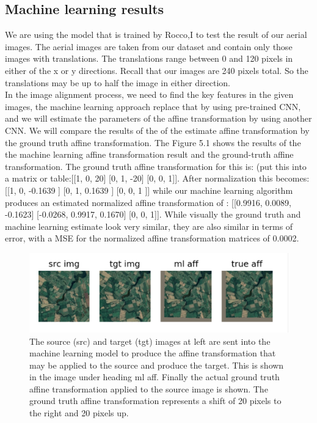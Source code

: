 \subsection{Machine learning results}
We are using the model that is trained by Rocco,I\cite{Rocco18} to test the result of our aerial images. 
The aerial images are taken from our dataset and contain only those images with translations. The translations range between 0 and 120 pixels in either of the x or y directions. Recall that our images are 240 pixels total. So the translations may be up to half the image in either direction.\\
  In the image alignment process, we need to find the key features in the given images, the machine learning approach replace that by using pre-trained CNN, and we will estimate the parameters of the affine transformation by using another CNN. 
  We will compare the results of the of the estimate affine transformation by the ground truth affine transformation.
  The Figure 5.1 shows the results of the the machine learning affine transformation result and the ground-truth affine transformation. The ground truth affine transformation for this is: (put this into a matrix or table:[[1, 0, 20] [0, 1, -20] [0, 0, 1]]. After normalization this becomes: [[1, 0, -0.1639 ] [0, 1, 0.1639 ] [0, 0, 1 ]] while our machine learning algorithm produces an estimated normalized affine transformation of : [[0.9916, 0.0089, -0.1623] [-0.0268, 0.9917, 0.1670] [0, 0, 1]]. While visually the ground truth and machine learning estimate look very similar, they are also similar in terms of error, with a MSE for the normalized affine transformation matrices of 0.0002.\\
\begin{figure}
\centering
\includegraphics[width = 5.0in]{figs/ml_affine_similar}
\caption{The source (src) and target (tgt) images at left are sent into the machine learning model to produce the affine transformation that may be applied to the source and produce the target. This is shown in the image under heading ml aff. Finally the actual ground truth affine transformation applied to the source image is shown. The ground truth affine transformation represents a shift of 20 pixels to the right and 20 pixels up.}
\end{figure}
